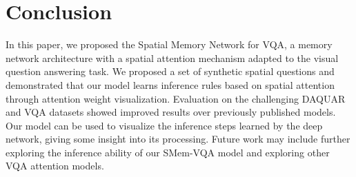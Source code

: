 \vspace{-0.1in}
\section{Conclusion}
\vspace{-0.1in}
In this paper, we proposed the Spatial Memory Network for VQA, a memory network architecture with a spatial attention mechanism adapted to the visual question answering task. We proposed a set of synthetic spatial questions and demonstrated that our model learns inference rules based on spatial attention through attention weight visualization. Evaluation on the challenging DAQUAR and VQA datasets showed  improved results over previously published models. Our model can be used to visualize the inference steps learned by the deep network, giving some insight into its processing. Future work may include further exploring the inference ability of our SMem-VQA model  and exploring other VQA attention models.
